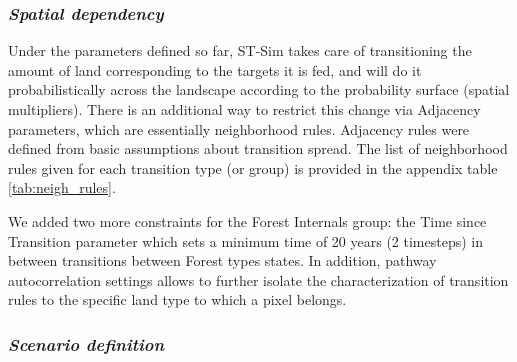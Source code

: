 \subsubsection*{\textit{Spatial dependency}}

Under the parameters defined so far, ST-Sim takes care of transitioning the amount of land corresponding to the targets it is fed, and will do it probabilistically across the landscape according to the probability surface (spatial multipliers). There is an additional way to restrict this change via Adjacency parameters, which are essentially neighborhood rules. Adjacency rules were defined from basic assumptions about transition spread. The list of neighborhood rules given for each transition type (or group) is provided in the appendix table \ref{tab:neigh_rules}.

We added two more constraints for the Forest Internals group: the Time since Transition parameter which sets a minimum time of 20 years (2 timesteps) in between transitions between Forest  types states. In addition, pathway autocorrelation settings allows to further isolate the characterization of transition rules to the specific land type to which a pixel belongs.\\

\subsubsection*{\textit{Scenario definition}}


